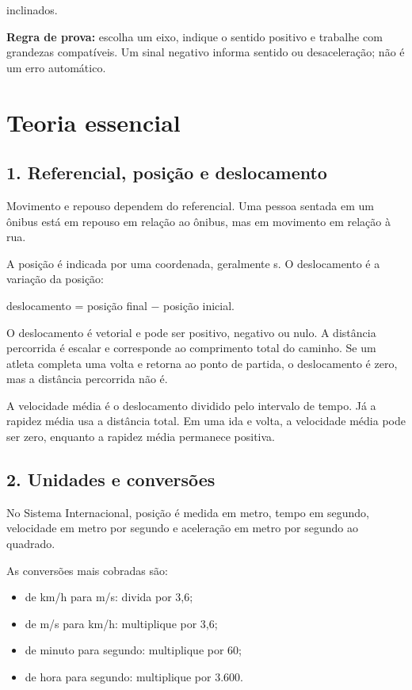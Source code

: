 \documentclass[11pt,a4paper]{article}
\begin{document}
   inclinados.

\textbf{Regra de prova:} escolha um eixo, indique o sentido positivo e trabalhe com grandezas compatíveis. Um sinal negativo informa sentido ou desaceleração; não é um erro automático.

\section*{Teoria essencial}

\subsection*{1. Referencial, posição e deslocamento}

Movimento e repouso dependem do referencial. Uma pessoa sentada em um ônibus está em repouso em relação ao ônibus, mas em movimento em relação à rua.

A posição é indicada por uma coordenada, geralmente s. O deslocamento é a variação da posição:

deslocamento = posição final − posição inicial.

O deslocamento é vetorial e pode ser positivo, negativo ou nulo. A distância percorrida é escalar e corresponde ao comprimento total do caminho. Se um atleta completa uma volta e retorna ao ponto de partida, o deslocamento é zero, mas a distância percorrida não é.

A velocidade média é o deslocamento dividido pelo intervalo de tempo. Já a rapidez média usa a distância total. Em uma ida e volta, a velocidade média pode ser zero, enquanto a rapidez média permanece positiva.

\subsection*{2. Unidades e conversões}

No Sistema Internacional, posição é medida em metro, tempo em segundo, velocidade em metro por segundo e aceleração em metro por segundo ao quadrado.

As conversões mais cobradas são:

\begin{itemize}
  \item de km/h para m/s: divida por 3,6;
  \item de m/s para km/h: multiplique por 3,6;
  \item de minuto para segundo: multiplique por 60;
  \item de hora para segundo: multiplique por 3.600.
\end{itemize}
\end{document}
